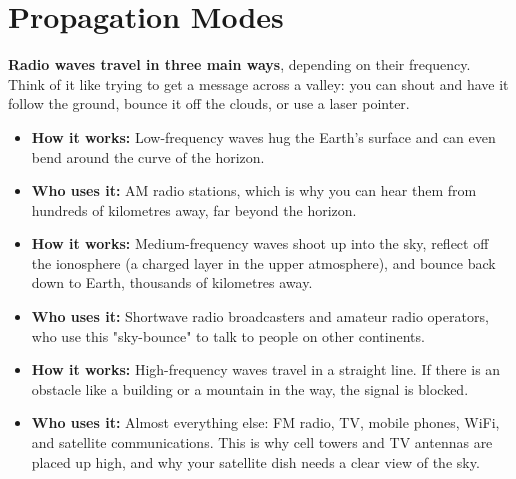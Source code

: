 
\chapter{Propagation Modes}
\label{ch:propagation-modes}

\begin{nontechnical}
    \textbf{Radio waves travel in three main ways}, depending on their frequency. Think of it like trying to get a message across a valley: you can shout and have it follow the ground, bounce it off the clouds, or use a laser pointer.

    \begin{itemize}
        \item \textbf{How it works:} Low-frequency waves hug the Earth's surface and can even bend around the curve of the horizon.
        \item \textbf{Who uses it:} AM radio stations, which is why you can hear them from hundreds of kilometres away, far beyond the horizon.
    \end{itemize}

    \begin{itemize}
        \item \textbf{How it works:} Medium-frequency waves shoot up into the sky, reflect off the ionosphere (a charged layer in the upper atmosphere), and bounce back down to Earth, thousands of kilometres away.
        \item \textbf{Who uses it:} Shortwave radio broadcasters and amateur radio operators, who use this "sky-bounce" to talk to people on other continents.
    \end{itemize}

    \begin{itemize}
        \item \textbf{How it works:} High-frequency waves travel in a straight line. If there is an obstacle like a building or a mountain in the way, the signal is blocked.
        \item \textbf{Who uses it:} Almost everything else: FM radio, TV, mobile phones, WiFi, and satellite communications. This is why cell towers and TV antennas are placed up high, and why your satellite dish needs a clear view of the sky.
    \end{itemize}
\end{nontechnical}


